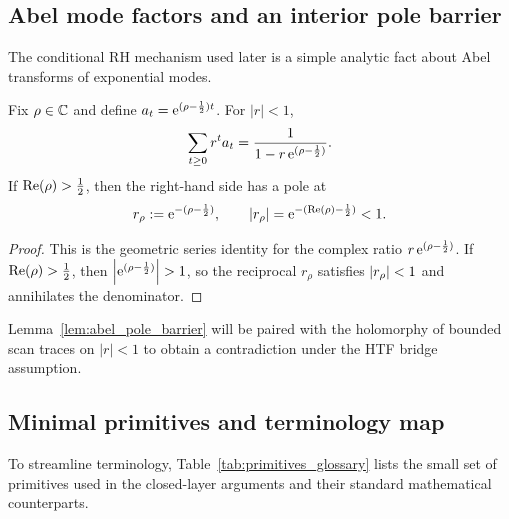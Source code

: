 \subsection{Abel mode factors and an interior pole barrier}
\label{sec:abel_pole_barrier_prelim}

The conditional RH mechanism used later is a simple analytic fact about Abel transforms of exponential modes.

\begin{lemma}
\label{lem:abel_pole_barrier}
Fix $\rho\in\mathbb{C}$ and define $a_t=\mathrm{e}^{(\rho-\frac12)t}$.
For $|r|<1$,
\[
\sum_{t\ge 0} r^t a_t = \frac{1}{1-r\,\mathrm{e}^{(\rho-\frac12)}}.
\]
If $\operatorname{Re}(\rho)>\tfrac12$, then the right-hand side has a pole at
\[
r_\rho:=\mathrm{e}^{-(\rho-\frac12)},
\qquad |r_\rho|=\mathrm{e}^{-(\operatorname{Re}(\rho)-\frac12)}<1.
\]
\end{lemma}

\begin{proof}
This is the geometric series identity for the complex ratio $r\,\mathrm{e}^{(\rho-\frac12)}$.
If $\operatorname{Re}(\rho)>\tfrac12$, then $\left\lvert \mathrm{e}^{(\rho-\frac12)}\right\rvert>1$, so the reciprocal $r_\rho$ satisfies $\left\lvert r_\rho\right\rvert<1$ and annihilates the denominator.
\end{proof}

Lemma~\ref{lem:abel_pole_barrier} will be paired with the holomorphy of bounded scan traces on $|r|<1$ to obtain a contradiction under the HTF bridge assumption.

\subsection{Minimal primitives and terminology map}
\label{sec:glossary_map}

To streamline terminology, Table~\ref{tab:primitives_glossary} lists the small set of primitives used in the closed-layer arguments and their standard mathematical counterparts.

